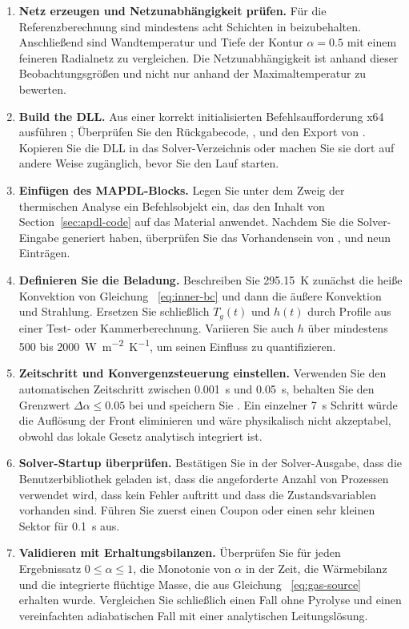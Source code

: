 \documentclass[oneside,openany]{amsdtx}
\begin{document}
\begin{enumerate}[leftmargin=2.2em,label=\textbf{\arabic*.}]
\item \textbf{Netz erzeugen und Netzunabhängigkeit prüfen.} Für die Referenzberechnung sind mindestens acht Schichten in  beizubehalten. Anschließend sind Wandtemperatur und Tiefe der Kontur \(\alpha=0{.}5\) mit einem feineren Radialnetz zu vergleichen. Die Netzunabhängigkeit ist anhand dieser Beobachtungsgrößen und nicht nur anhand der Maximaltemperatur zu bewerten.

\item \textbf{Build the DLL.} Aus einer korrekt initialisierten Befehlsaufforderung x64 ausführen ; Überprüfen Sie den Rückgabecode, ,  und den Export von . Kopieren Sie die DLL in das Solver-Verzeichnis oder machen Sie sie dort auf andere Weise zugänglich, bevor Sie den Lauf starten.

\item \textbf{Einfügen des MAPDL-Blocks.} Legen Sie unter dem Zweig der thermischen Analyse ein Befehlsobjekt ein, das den Inhalt von Section~\ref{sec:apdl-code} auf das Material  anwendet. Nachdem Sie die Solver-Eingabe generiert haben, überprüfen Sie das Vorhandensein von ,  und neun  Einträgen.

\item \textbf{Definieren Sie die Beladung.} Beschreiben Sie \SI{295.15}{K} zunächst die heiße Konvektion von Gleichung ~\eqref{eq:inner-bc} und dann die äußere Konvektion und Strahlung. Ersetzen Sie schließlich \(T_g(t)\) und \(h(t)\) durch Profile aus einer Test- oder Kammerberechnung. Variieren Sie auch \(h\) über mindestens 500 bis \SI{2000}{W.m^{-2}.K^{-1}}, um seinen Einfluss zu quantifizieren.

\item \textbf{Zeitschritt und Konvergenzsteuerung einstellen.} Verwenden Sie den automatischen Zeitschritt zwischen \SI{0.001}{s} und \SI{0.05}{s}, behalten Sie den Grenzwert \(\Delta\alpha\le0{.}05\) bei und speichern Sie . Ein einzelner \SI{7}{s} Schritt würde die Auflösung der Front eliminieren und wäre physikalisch nicht akzeptabel, obwohl das lokale Gesetz analytisch integriert ist.

\item \textbf{Solver-Startup überprüfen.} Bestätigen Sie in der Solver-Ausgabe, dass die Benutzerbibliothek geladen ist, dass die angeforderte Anzahl von Prozessen verwendet wird, dass kein  Fehler auftritt und dass die Zustandsvariablen vorhanden sind. Führen Sie zuerst einen Coupon oder einen sehr kleinen Sektor für \SI{0.1}{s} aus.

\item \textbf{Validieren mit Erhaltungsbilanzen.} Überprüfen Sie für jeden Ergebnissatz \(0\le\alpha\le1\), die Monotonie von \(\alpha\) in der Zeit, die Wärmebilanz und die integrierte flüchtige Masse, die aus Gleichung ~\eqref{eq:gas-source} erhalten wurde. Vergleichen Sie schließlich einen Fall ohne Pyrolyse und einen vereinfachten adiabatischen Fall mit einer analytischen Leitungslösung.
\end{enumerate}
\end{document}
